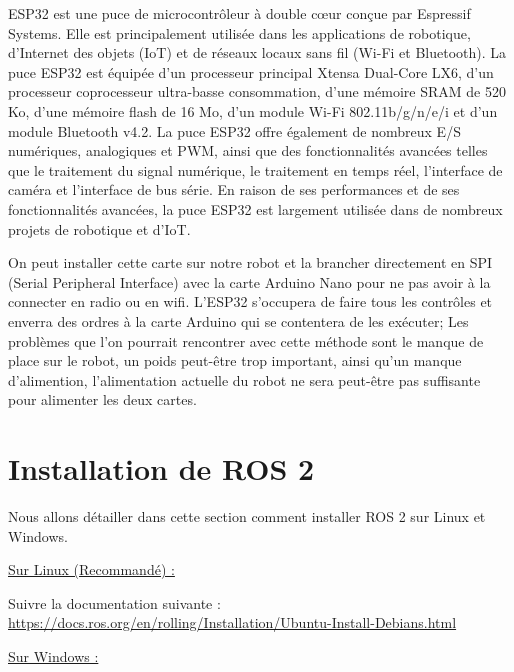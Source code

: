 ESP32 est une puce de microcontrôleur à double cœur conçue par Espressif Systems. Elle est principalement utilisée 
dans les applications de robotique, d'Internet des objets (IoT) et de réseaux locaux sans fil (Wi-Fi et Bluetooth). 
La puce ESP32 est équipée d'un processeur principal Xtensa Dual-Core LX6, d'un processeur coprocesseur ultra-basse consommation, 
d'une mémoire SRAM de 520 Ko, d'une mémoire flash de 16 Mo, d'un module Wi-Fi 802.11b/g/n/e/i et d'un module Bluetooth v4.2. 
La puce ESP32 offre également de nombreux E/S numériques, analogiques et PWM, ainsi que des fonctionnalités avancées telles 
que le traitement du signal numérique, le traitement en temps réel, l'interface de caméra et l'interface de bus série. 
En raison de ses performances et de ses fonctionnalités avancées, la puce ESP32 est largement utilisée dans de nombreux projets de 
robotique et d'IoT.
\linebreak
	
On peut installer cette carte sur notre robot et la brancher directement en SPI (Serial Peripheral Interface) avec la carte Arduino Nano pour 
ne pas avoir à la connecter en radio ou en wifi.  
L’ESP32 s’occupera de faire tous les contrôles et enverra des ordres à la carte Arduino qui se contentera de les exécuter; 
Les problèmes que l’on pourrait rencontrer avec cette méthode sont le manque de place sur le robot, un poids peut-être trop important, ainsi 
qu’un manque d’alimention, l’alimentation actuelle du robot ne sera peut-être pas suffisante pour alimenter les deux cartes. 
\linebreak

		\section{Installation de ROS 2}

Nous allons détailler dans cette section comment installer ROS 2 sur Linux et Windows.
\linebreak

\underline{Sur Linux (Recommandé) :}
 
Suivre la documentation suivante :
\url{https://docs.ros.org/en/rolling/Installation/Ubuntu-Install-Debians.html}
 \linebreak

 \underline{Sur Windows :}
 
